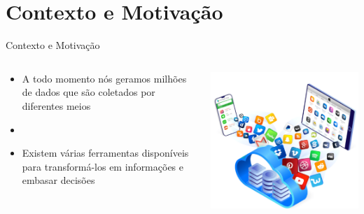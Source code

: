 \documentclass[10pt,brazil]{beamer}
\theoremstyle{definition}
\begin{document}
\section{Contexto e Motivação}
\begin{frame}[allowframebreaks]{Contexto e Motivação}
  \begin{columns}
    \begin{column}{0.5\textwidth}
      \begin{itemize}
        \item[] A todo momento nós geramos milhões de dados que são coletados por diferentes meios
        \item[]
        \item[] Existem várias ferramentas disponíveis para transformá-los em informações e embasar decisões
      \end{itemize}
    \end{column}
    \begin{column}{0.5\textwidth}
      \begin{center}
        \includegraphics[width=1\textwidth]{sis.png}
      \end{center}
    \end{column}
  \end{columns}
  \framebreak
  \begin{columns}

\end{columns}
\end{frame}
\end{document}
